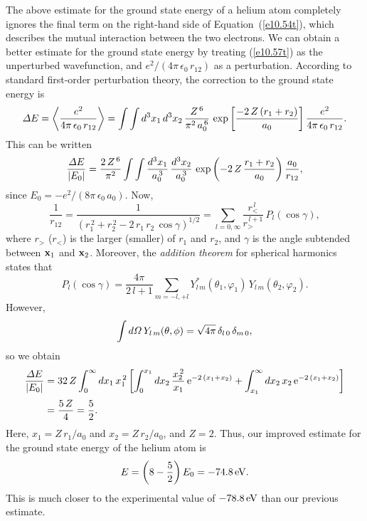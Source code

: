 The above estimate for the ground state energy of a helium atom completely ignores the final term on the right-hand side of Equation~(\ref{e10.54t}),
which describes the mutual interaction between the two electrons. We can obtain a better estimate for the ground state energy by treating (\ref{e10.57t})
as the unperturbed wavefunction, and $e^2/(4\pi\,\epsilon_0\,r_{12})$ as a perturbation. According to standard first-order perturbation theory, the
correction to the ground state energy is
\begin{equation}
{\mit\Delta} E = \left\langle \frac{e^2}{4\pi\,\epsilon_0\,r_{12}}\right\rangle=\int\int d^3x_1\,d^3 x_2\,\frac{Z^{\,6}}{\pi^2\,a_0^{\,6}}\,\exp\left[\frac{-2\,Z\,(r_1+r_2)}{a_0}\right]\frac{e^2}{4\pi\,\epsilon_0\,r_{12}}.
\end{equation}
This can be written
\begin{equation}
\frac{{\mit\Delta E}}{|E_0|} = \frac{2\,Z^{\,6}}{\pi^2}\int\int \frac{d^3 x_1}{a_0^{\,3}}\,\frac{d^3 x_2}{a_0^{\,3}}\,\exp\left(-2\,Z\,\frac{r_1+r_2}{a_0}\right)
\frac{a_0}{r_{12}},
\end{equation}
since $E_0=-e^2/(8\pi\,\epsilon_0\,a_0)$. Now, 
\begin{equation}
\frac{1}{r_{12}} = \frac{1}{(r_1^{\,2}+r_2^{\,2}-2\,r_1\,r_2\,\cos\gamma)^{1/2} }= \sum_{l=0,\infty} \frac{r_<^{\,l}}{r_>^{\,l+1}}\,P_l(\cos\gamma),
\end{equation}
where $r_>$ ($r_<$) is the larger (smaller) of $r_1$ and $r_2$, and $\gamma$ is the angle subtended between ${\bf x}_1$ and ${\bf x}_2$. 
Moreover, the {\em addition theorem}\/ for spherical harmonics states that
\begin{equation}
P_l(\cos\gamma) = \frac{4\pi}{2\,l+1}\sum_{m=-l,+l} Y_{l\,m}^\ast(\theta_1,\varphi_1)\,Y_{l\,m}(\theta_2,\varphi_2).
\end{equation}
However, 
\begin{equation}
\int d{\mit\Omega}  \,Y_{l\,m}(\theta,\phi) = \sqrt{4\pi}\,\delta_{l\,0}\,\delta_{m\,0},
\end{equation}
so we obtain 
\begin{align}
\frac{{\mit\Delta E}}{|E_0|}& = 32\,Z\int_0^\infty d x_1\,x_1^{\,2}\left[\int_0^{x_1} d x_2\,\frac{x_2^{\,2}}{x_1}\,{\rm e}^{-2\,(x_1+x_2)}
+\int_{x_1}^\infty dx_2\,x_2\,{\rm e}^{-2\,(x_1+x_2)}\right]\nonumber\\[0.5ex]
&= \frac{5\,Z}{4} = \frac{5}{2}.
\end{align}
 Here, $x_1=Z\,r_1/a_0$ and $x_2=Z\,r_2/a_0$, and $Z=2$.  
Thus, our improved estimate for the ground state energy of the helium atom is
\begin{equation}
E = \left(8 - \frac{5}{2}\right)E_0 = -74.8\,{\rm eV}.
\end{equation}
This is much closer to the experimental value of $-78.8\,{\rm eV}$ than our previous estimate. 

